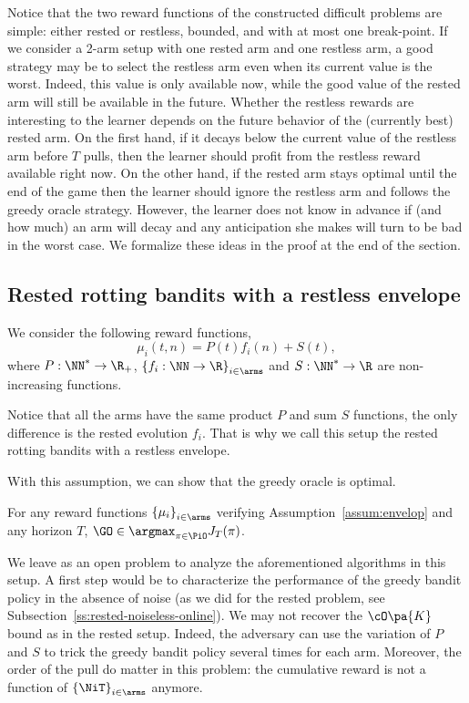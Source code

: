 Notice that the two reward functions of the constructed difficult problems are simple: either rested or restless, bounded, and with at most one break-point. If we consider a 2-arm setup with one rested arm and one restless arm, a good strategy may be to select the restless arm even when its current value is the worst. Indeed, this value is only available now, while the good value of the rested arm will still be available in the future. Whether the restless rewards are interesting to the learner depends on the future behavior of the (currently best) rested arm. On the first hand, if it decays below the current value of the restless arm before $T$ pulls, then the learner should profit from the restless reward available right now. On the other hand, if the rested arm stays optimal until the end of the game then the learner should ignore the restless arm and follows the greedy oracle strategy. However, the learner does not know in advance if (and how much) an arm will decay and any anticipation she makes will turn to be bad in the worst case. We formalize these ideas in the proof at the end of the section.

\subsection{Rested rotting bandits with a restless envelope}
\begin{assumption}
\label{assum:envelop}
We consider the following reward functions, 
\[
\mu_i(t,n) = P(t) f_i(n) + S(t),
\]
where $P: \NN^* \rightarrow \R_+$, $\left\{f_i : \NN \rightarrow \R\right\}_{i \in \arms}$ and $S: \NN^* \rightarrow \R$ are non-increasing functions. 
\end{assumption}

Notice that all the arms have the same product $P$ and sum $S$ functions, the only difference is the rested evolution $f_i$. That is why we call this setup the rested rotting bandits with a restless envelope.

With this assumption, we can show that the greedy oracle is optimal.
\begin{proposition}
\label{prop:envelop}
For any reward functions $\left\{\mu_i\right\}_{i \in \arms}$ verifying Assumption~\ref{assum:envelop} and any horizon $T$, $\GO \in \argmax_{\pi \in \PiO} J_T(\pi)$.
\end{proposition}

We leave as an open problem to analyze the aforementioned algorithms in this setup. A first step would be to characterize the performance of the greedy bandit policy in the absence of noise (as we did for the rested problem, see Subsection~\ref{ss:rested-noiseless-online}). We may not recover the $\cO\pa{K}$ bound as in the rested setup. Indeed, the adversary can use the variation of $P$ and $S$ to trick the greedy bandit policy several times for each arm. Moreover, the order of the pull do matter in this problem: the cumulative reward is not a function of $\left\{\NiT\right\}_{i \in \arms}$ anymore.

